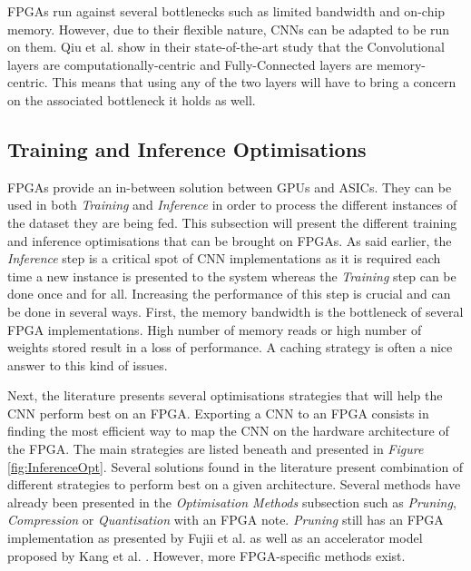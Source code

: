 FPGAs run against several bottlenecks such as limited bandwidth and on-chip memory. However, due to their flexible nature, CNNs can be adapted to be run on them. Qiu et al. \cite{Qiu2016} show in their state-of-the-art study that the Convolutional layers are computationally-centric and Fully-Connected layers are memory-centric. This means that using any of the two layers will have to bring a concern on the associated bottleneck it holds as well.


\subsection{Training and Inference Optimisations}

FPGAs provide an in-between solution between GPUs and ASICs. They can be used in both \emph{Training} and \emph{Inference} in order to process the different instances of the dataset they are being fed. This subsection will present the different training and inference optimisations that can be brought on FPGAs. As said earlier, the \emph{Inference} step is a critical spot of CNN implementations as it is required each time a new instance is presented to the system whereas the \emph{Training} step can be done once and for all. Increasing the performance of this step is crucial and can be done in several ways. First, the memory bandwidth is the bottleneck of several FPGA implementations. High number of memory reads or high number of weights stored result in a loss of performance. A caching strategy is often a nice answer to this kind of issues.

Next, the literature presents several optimisations strategies that will help the CNN perform best on an FPGA. Exporting a CNN to an FPGA consists in finding the most efficient way to map the CNN on the hardware architecture of the FPGA. The main strategies are listed beneath and presented in \emph{Figure} \ref{fig:InferenceOpt}. Several solutions found in the literature present combination of different strategies to perform best on a given architecture. Several methods have already been presented in the \emph{Optimisation Methods} subsection such as \emph{Pruning}, \emph{Compression} or \emph{Quantisation} with an FPGA note. \emph{Pruning} still has an FPGA implementation as presented by Fujii et al. \cite{Fujii2017} as well as an accelerator model proposed by Kang et al. \cite{Kang2019}. However, more FPGA-specific methods exist.


